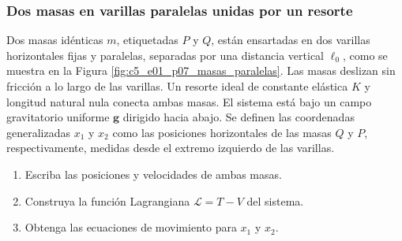 \subsubsection{Dos masas en varillas paralelas unidas por un resorte}

Dos masas idénticas $m$, etiquetadas $P$ y $Q$, están ensartadas en dos varillas
horizontales fijas y paralelas, separadas por una distancia vertical $\ell_0$, como se
muestra en la Figura \ref{fig:c5_e01_p07_masas_paralelas}. Las masas deslizan sin
fricción a lo largo de las varillas. Un resorte ideal de constante elástica $K$ y
longitud natural nula conecta ambas masas. El sistema está bajo un campo gravitatorio
uniforme $\mathbf{g}$ dirigido hacia abajo. Se definen las coordenadas generalizadas
$x_1$ y $x_2$ como las posiciones horizontales de las masas $Q$ y $P$, respectivamente,
medidas desde el extremo izquierdo de las varillas.

\begin{enumerate}
    \item Escriba las posiciones y velocidades de ambas masas.
    \item Construya la función Lagrangiana $\mathcal{L}=T-V$ del sistema.
    \item Obtenga las ecuaciones de movimiento para $x_1$ y $x_2$.
\end{enumerate}

